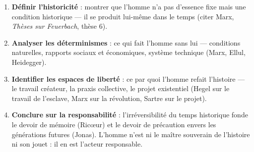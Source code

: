 \documentclass[11pt]{article}
\begin{document}
\begin{methode}
\begin{enumerate}
\item \textbf{Définir l'historicité} : montrer que l'homme n'a pas d'essence fixe mais une condition historique — il se produit lui-même dans le temps (citer Marx, \emph{Thèses sur Feuerbach}, thèse 6).
\item \textbf{Analyser les déterminismes} : ce qui fait l'homme sans lui — conditions naturelles, rapports sociaux et économiques, système technique (Marx, Ellul, Heidegger).
\item \textbf{Identifier les espaces de liberté} : ce par quoi l'homme refait l'histoire — le travail créateur, la praxis collective, le projet existentiel (Hegel sur le travail de l'esclave, Marx sur la révolution, Sartre sur le projet).
\item \textbf{Conclure sur la responsabilité} : l'irréversibilité du temps historique fonde le devoir de mémoire (Ricœur) et le devoir de précaution envers les générations futures (Jonas). L'homme n'est ni le maître souverain de l'histoire ni son jouet : il en est l'acteur responsable.
\end{enumerate}
\end{methode}
\end{document}
